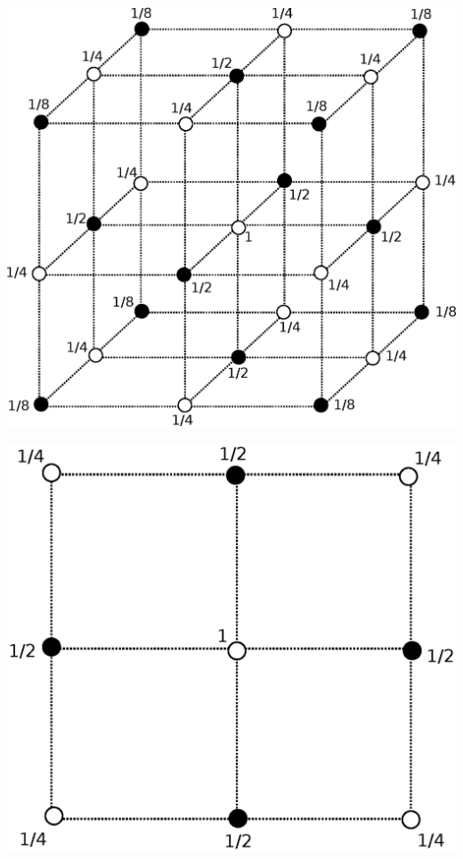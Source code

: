 \documentclass[10pt,a4paper]{article}
\begin{document}
\begin{minipage}[c]{0.5\textwidth}

\includegraphics[width=\textwidth]{./figures/wuerfel.eps}

\end{minipage}
\begin{minipage}[c]{0.5\textwidth}
\includegraphics[width=\textwidth]{./figures/quadrat.eps}
\end{minipage}
\end{document}

